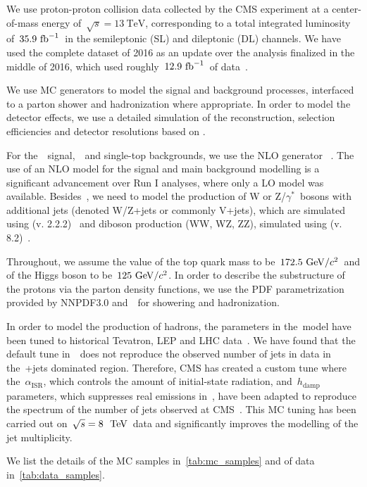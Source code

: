 We use proton-proton collision data collected by the CMS experiment at a center-of-mass energy of~$\sqrt{s} = 13~\mathrm{TeV}$, corresponding to a total integrated luminosity of~$35.9~\mathrm{fb}^{-1}$~in the semileptonic (SL) and dileptonic (DL) channels. We have used the complete dataset of 2016 as an update over the analysis finalized in the middle of 2016, which used roughly~$12.9~\mathrm{fb}^{-1}$~of data~\cite{CMS:2016zbb}.

We use MC generators to model the signal and background processes, interfaced to a parton shower and hadronization where appropriate. In order to model the detector effects, we use a detailed simulation of the reconstruction, selection efficiencies and detector resolutions based on \geant.

For the~\ttH~signal,~\ttbar~and single-top backgrounds, we use the NLO generator \powheg~\cite{Frixione:2007vw,Re:2010bp}. The use of an NLO model for the signal and main background modelling is a significant advancement over Run I analyses, where only a LO model was available. Besides~\ttbar, we need to model the production of W or Z/$\gamma^*$~bosons with additional jets (denoted W/Z+jets or commonly V+jets), which are simulated using \madgraphatnlo (v. 2.2.2)~\cite{Hirschi:2011pa} and diboson production (WW, WZ, ZZ), simulated using \pythia (v. 8.2)~\cite{Sjostrand:2007gs}.

Throughout, we assume the value of the top quark mass to be~$172.5~\mathrm{GeV}/c^2$~and of the Higgs boson to be~$125~\mathrm{GeV}/c^2$. In order to describe the substructure of the protons via the parton density functions, we use the PDF parametrization provided by NNPDF3.0 and~\pythia~for showering and hadronization.

In order to model the production of hadrons, the parameters in the~\pythia model have been tuned to historical Tevatron, LEP and LHC data~\cite{CMS-PAS-GEN-14-001,Skands:2014pea}. We have found that the default tune in~\pythia~does not reproduce the observed number of jets in data in the~\ttbar+jets dominated region. Therefore, CMS has created a custom tune where the~$\alpha_{\mathrm{ISR}}$, which controls the amount of initial-state radiation, and~$h_{\mathrm{damp}}$ parameters, which suppresses real emissions in~\powheg, have been adapted to reproduce the spectrum of the number of jets observed at CMS~\cite{CMS-PAS-TOP-16-021}. This MC tuning has been carried out on~$\sqrt{s} = 8~~\mathrm{TeV}$~data and significantly improves the modelling of the jet multiplicity.

We list the details of the MC samples in~\cref{tab:mc_samples} and of data in~\cref{tab:data_samples}.

